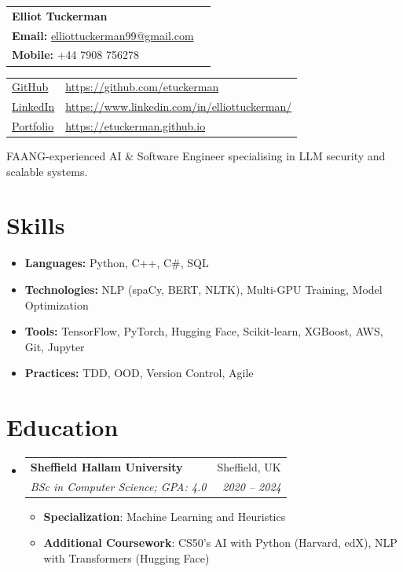 \documentclass[letterpaper,11pt]{article}
\makeatletter
\newcommand{\resumeItem}[2]{
  \item\small{
    \textbf{#1}{: #2 \vspace{-2pt}}
  }
}
\newcommand{\resumeSubheading}[4]{
  \vspace{-1pt}\item
    \begin{tabular*}{0.97\textwidth}{l@{\extracolsep{\fill}}r}
      \textbf{#1} & #2 \\
      \textit{\small#3} & \textit{\small #4} \\
    \end{tabular*}\vspace{-5pt}
}
\newcommand{\resumeSubHeadingListStart}{\begin{itemize}[leftmargin=*, itemsep=0pt]}
\newcommand{\resumeSubHeadingListEnd}{\end{itemize}}
\newcommand{\resumeItemListStart}{\begin{itemize}[itemsep=0pt]}
\newcommand{\resumeItemListEnd}{\end{itemize}\vspace{-5pt}}
\makeatother
\begin{document}
\begin{tabularx}{\textwidth}{Xr}
  \textbf{\Huge Elliot Tuckerman} & 
  \begin{minipage}[t]{0.5\textwidth}
    \raggedleft
    \textbf{Address:} Sheffield, UK \\
    \textbf{Email:} \href{mailto:elliottuckerman99@gmail.com}{elliottuckerman99@gmail.com} \\
    \textbf{Mobile:} +44 7908 756278
  \end{minipage} \\
\end{tabularx}

\begin{tabular}{l l}
  \href{https://github.com/etuckerman}{GitHub} & \href{https://github.com/etuckerman}{https://github.com/etuckerman} \\
  \href{https://www.linkedin.com/in/elliottuckerman/}{LinkedIn} & \href{https://www.linkedin.com/in/elliottuckerman/}{https://www.linkedin.com/in/elliottuckerman/} \\
  \href{https://etuckerman.github.io}{Portfolio} & \href{https://etuckerman.github.io}{https://etuckerman.github.io}
\end{tabular}

\vspace{-0.2cm}
\begin{center}
FAANG-experienced AI \& Software Engineer specialising in LLM security and scalable systems.
\end{center}
\vspace{-0.8cm}

\section{Skills}
 \resumeSubHeadingListStart
   \item \textbf{Languages:} Python, C++, C\#, SQL
   \item \textbf{Technologies:} NLP (spaCy, BERT, NLTK), Multi-GPU Training, Model Optimization
   \item \textbf{Tools:} TensorFlow, PyTorch, Hugging Face, Scikit-learn, XGBoost, AWS, Git, Jupyter
   \item \textbf{Practices:} TDD, OOD, Version Control, Agile
 \resumeSubHeadingListEnd

\vspace{-0.5cm}

\section{Education}
 \resumeSubHeadingListStart
    \resumeSubheading
      {Sheffield Hallam University}{Sheffield, UK}
      {BSc in Computer Science; GPA: 4.0}{2020 -- 2024}
      \resumeItemListStart
        \resumeItem{Specialization}{Machine Learning and Heuristics}
        \resumeItem{Additional Coursework}{CS50's AI with Python (Harvard, edX), NLP with Transformers (Hugging Face)}
      \resumeItemListEnd
  \resumeSubHeadingListEnd
\end{document}
